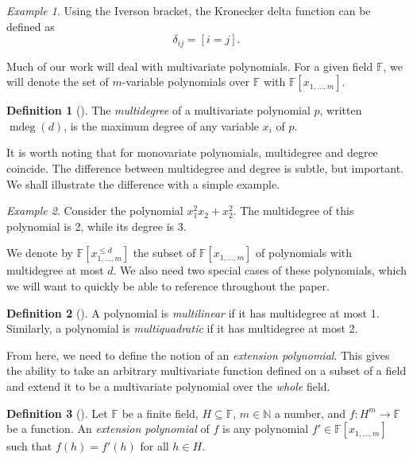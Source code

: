\documentclass[english,12pt]{reedthesis}
\theoremstyle{plain}
\theoremstyle{definition}
\newtheorem{defn}[defn]{Definition}
\theoremstyle{remark}
\newtheorem{example}{Example}[thm]
\DeclareMathOperator{\mdeg}{mdeg}
\begin{document}
\begin{example}
  Using the Iverson bracket, the Kronecker delta function can be defined as
  \[
    \delta_{ij} = [i = j].
  \]
\end{example}

Much of our work will deal with multivariate polynomials. For a given field
$\mathbb{F}$, we will denote the set of $m$-variable polynomials over
$\mathbb{F}$ with $\mathbb{F}[x_{1, \ldots, m}]$.

\begin{defn}[{\cite[8]{AW09}}]\label{def:mdeg}
  The \emph{multidegree} of a multivariate polynomial $p$, written $\mdeg(d)$,
  is the maximum degree of any variable $x_{i}$ of $p$.
\end{defn}

It is worth noting that for monovariate polynomials, multidegree and degree
coincide. The difference between multidegree and degree is subtle, but
important. We shall illustrate the difference with a simple example.

\begin{example}
  Consider the polynomial $x_{1}^{2}x_{2} + x_{2}^{2}$. The multidegree of this
  polynomial is 2, while its degree is 3.
\end{example}

We denote by $\mathbb{F}[x_{1, \ldots, m}^{\le d}]$ the subset of
$\mathbb{F}[x_{1, \ldots, m}]$ of polynomials with multidegree at most $d$. We also
need two special cases of these polynomials, which we will want to quickly be
able to reference throughout the paper.

\begin{defn}[{\cite[8]{AW09}}]\label{def:mlin}
  A polynomial is \emph{multilinear} if it has multidegree at most 1. Similarly,
  a polynomial is \emph{multiquadratic} if it has multidegree at most 2.
\end{defn}

From here, we need to define the notion of an \emph{extension polynomial}. This
gives the ability to take an arbitrary multivariate function defined on a subset
of a field and extend it to be a multivariate polynomial over the \emph{whole}
field.

\begin{defn}[{\cite[8]{AW09}}]\label{def:ext-poly}
  Let $\mathbb{F}$ be a finite field, $H \subseteq \mathbb{F}$, $m \in \mathbb{N}$ a number, and
  $f\colon H^{m} \rightarrow \mathbb{F}$ be a function. An \emph{extension polynomial} of
  $f$ is any polynomial $f' \in \mathbb{F}[x_{1, \ldots, m}]$ such that $f(h) = f'(h)$
  for all $h \in H$.
\end{defn}
\end{document}
